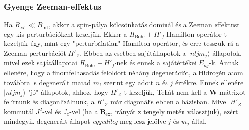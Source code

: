 \documentclass[../main.tex]{subfiles}
\begin{document}
\subsubsection*{Gyenge Zeeman-effektus}
Ha $B_{\text{ext}} \ll B_{\text{int}}$, akkor a spin-pálya kölcsönhatás dominál és a Zeeman effektust egy kis perturbációként kezeljük. Ekkor a $H_{\text{Bohr}} + H'_{f}$ Hamilton operátor-t kezeljük úgy, mint egy "perturbálatlan" Hamilton operátor,
és erre tesszük rá a Zeeman perturbációt $H'_{Z}$. Ebben az esetben sajátállapotok a $|n l j m_j \rangle$ állapotok, mivel ezek sajátállapotai $H_{\text{Bohr}} + H'_{f}$-nek és ennek a sajátértékei $E_{n j}$-k.
Annak ellenére, hogy a finomfelhasadás feloldott néhány degenerációt, a Hidrogén atom továbbra is degenerált marad $m_j$ szerint egy adott $n$ és $j$ értékre. Ennek ellenére $|n l j m_j \rangle$ "jó" állapotok, ahhoz, hogy $H'_Z$-t kezeljük,
Tehát nem kell a $\textbf{W}$ mátrixot felírnunk és diagonlizálnunk, a $H'_Z$ már diagonális ebben a bázisban. Mivel $H'_Z$ kommutál $J^2$-vel és $J_z$-vel (ha a $\mathbf{B}_{\text{ext}}$ irányát z tengely metén választjuk),
ezért mindegyik degenerált állapot \textit{egyedileg} meg lesz jelölve $j$ és $m_j$ által.
\end{document}
